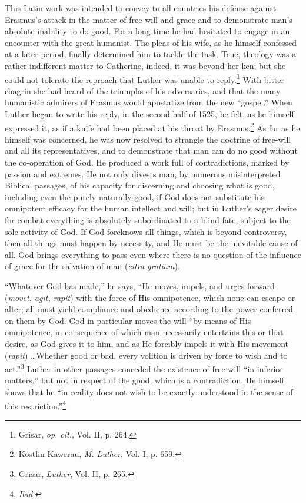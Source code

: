 This Latin work was intended to convey to all countries his
defense against Erasmus’s attack in the matter of free-will and
grace and to demonstrate man’s absolute inability to do good. For
a long time he had hesitated to engage in an encounter with the
great humanist. The pleas of his wife, as he himself confessed at a
later period, finally determined him to tackle the task. True, theology
was a rather indifferent matter to Catherine, indeed, it was beyond
her ken; but she could not tolerate the reproach that Luther was
unable to reply.\footnote{Grisar, \textit{op. cit.}, Vol. II, p. 264. }
With bitter chagrin she had heard of the triumphs
of his adversaries, and that the many humanistic admirers of Erasmus
would apostatize from the new “gospel.” When Luther began to
write his reply, in the second half of 1525, he felt, as he himself
expressed it, as if a knife had been placed at his throat by Erasmus.\footnote
{Köstlin-Kawerau, \textit{M. Luther}, Vol. I, p. 659. }
As far as he himself was concerned, he was now resolved to strangle
the doctrine of free-will and all its representatives, and to demonstrate
that man can do no good without the co-operation of God.
He produced a work full of contradictions, marked by passion and
extremes. He not only divests man, by numerous misinterpreted Biblical
passages, of his capacity for discerning and choosing what is good, including
even the purely naturally good, if God does not substitute his omnipotent
efficacy for the human intellect and will; but in Luther's eager desire
for combat everything is absolutely subordinated to a blind fate, subject
to the sole activity of God. If God foreknows all things, which is beyond
controversy, then all things must happen by necessity, and He must be
the inevitable cause
of all. God brings everything to pass even where there is no question
of the influence of grace for the salvation of man (\textit{citra gratiam}).

“Whatever God has made,” he says, “He moves, impels, and urges forward
(\textit{movet, agit, rapit}) with the force of His omnipotence, which none can
escape or alter; all must yield compliance and obedience according to the
power conferred on them by God. God in particular moves the will “by means
of His omnipotence, in consequence of which man necessarily entertains this
or that desire, as God gives it to him, and as He forcibly impels it with His
movement (\textit{rapit}) \dots Whether good or bad, every volition is driven by
force to wish and to act.”\footnote{Grisar, \textit{Luther}, Vol. II, p. 265.}
Luther in other passages conceded the existence
of free-will “in inferior matters,” but not in respect of the good, which is a
contradiction. He himself shows that he “in reality does not wish to be
exactly understood in the sense of this restriction.”\footnote{\textit{Ibid.}}

